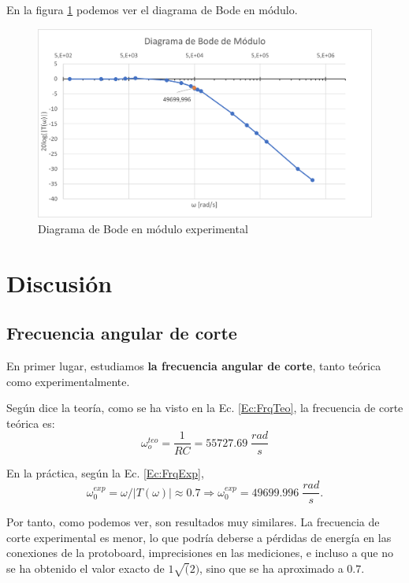 En la figura \ref{fig:BodeExp} podemos ver el diagrama de Bode en módulo.
\begin{figure}
    \centering
    \includegraphics[width=13.5cm]{Imágenes 03/Grafico_Exp.png}
    \caption{Diagrama de Bode en módulo experimental}
    \label{fig:BodeExp}
\end{figure}

\section{Discusión}

\subsection{Frecuencia angular de corte}

En primer lugar, estudiamos \textbf{la frecuencia angular de corte}, tanto teórica como experimentalmente.

Según dice la teoría, como se ha visto en la Ec. \ref{Ec:FrqTeo}, la frecuencia de corte teórica es:
\begin{equation}
    \omega_o^{teo} = \frac{1}{RC} = 55727.69 \;\frac{rad}{s}
\end{equation}

En la práctica, según la Ec. \ref{Ec:FrqExp}, 
\begin{equation}
    \omega_0^{exp} = \omega / |T(\omega)| \approx 0.7 \Longrightarrow \omega_0^{exp} = 49699.996\;\frac{rad}{s}.
\end{equation}

Por tanto, como podemos ver, son resultados muy similares. La frecuencia de corte experimental es menor, lo que podría deberse a pérdidas de energía en las conexiones de la protoboard, imprecisiones en las mediciones, e incluso a que no se ha obtenido el valor exacto de $1\sqrt(2)$, sino que se ha aproximado a $0.7$.

